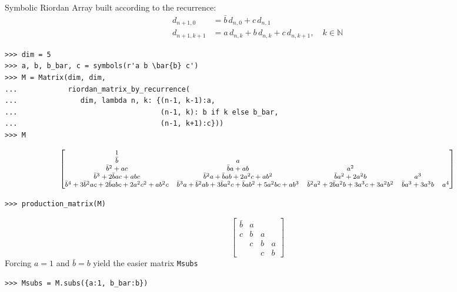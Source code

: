 \begin{example}
Symbolic Riordan Array built according to the recurrence:
\begin{displaymath}
\begin{split}
d_{n+1, 0} &= \bar{b}\,d_{n, 0} + c\,d_{n,1} \\
d_{n+1, k+1} &= a\,d_{n, k} + b\,d_{n, k} + c\,d_{n,k+1}, \quad k \in\mathbb{N}
\end{split}
\end{displaymath}
\begin{verbatim}
>>> dim = 5
>>> a, b, b_bar, c = symbols(r'a b \bar{b} c')
>>> M = Matrix(dim, dim,
...            riordan_matrix_by_recurrence(
...               dim, lambda n, k: {(n-1, k-1):a,
...                                  (n-1, k): b if k else b_bar,
...                                  (n-1, k+1):c}))
>>> M
\end{verbatim}
\begin{displaymath}
\footnotesize
\left[\begin{matrix}1 &   &   &   &  \\\bar{b} & a &   &   &  \\\bar{b}^{2} + a c & \bar{b} a + a b & a^{2} &   &  \\\bar{b}^{3} + 2 \bar{b} a c + a b c & \bar{b}^{2} a + \bar{b} a b + 2 a^{2} c + a b^{2} & \bar{b} a^{2} + 2 a^{2} b & a^{3} &  \\\bar{b}^{4} + 3 \bar{b}^{2} a c + 2 \bar{b} a b c + 2 a^{2} c^{2} + a b^{2} c & \bar{b}^{3} a + \bar{b}^{2} a b + 3 \bar{b} a^{2} c + \bar{b} a b^{2} + 5 a^{2} b c + a b^{3} & \bar{b}^{2} a^{2} + 2 \bar{b} a^{2} b + 3 a^{3} c + 3 a^{2} b^{2} & \bar{b} a^{3} + 3 a^{3} b & a^{4}\end{matrix}\right]
\end{displaymath}
\begin{verbatim}
>>> production_matrix(M)
\end{verbatim}
\begin{displaymath}
\left[\begin{matrix}\bar{b} & a &   &  \\c & b & a &  \\  & c & b & a\\  &   & c & b\end{matrix}\right]
\end{displaymath}
Forcing $a=1$ and $\bar{b} = b$ yield the easier matrix \verb|Msubs|
\begin{verbatim}
>>> Msubs = M.subs({a:1, b_bar:b})

\end{verbatim}
\end{example}
